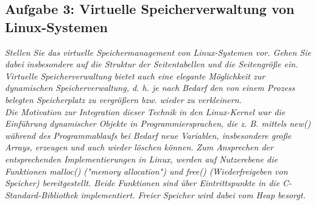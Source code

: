 \documentclass[a4paper]{article}
\begin{document}
\subsection{Aufgabe 3: Virtuelle Speicherverwaltung von Linux-Systemen}
\textit{Stellen Sie das virtuelle Speichermanagement von Linux-Systemen vor. Gehen Sie dabei insbesondere auf die Struktur der Seitentabellen und die Seitengröße ein.\\
    Virtuelle Speicherverwaltung bietet auch eine elegante Möglichkeit zur dynamischen Speicherverwaltung, d. h. je nach Bedarf den von einem Prozess belegten Speicherplatz zu vergrößern bzw. wieder zu verkleinern.\\
    Die Motivation zur Integration dieser Technik in den Linux-Kernel war die Einführung dynamischer Objekte in Programmiersprachen, die z. B. mittels new() während des Programmablaufs bei Bedarf neue Variablen, insbesondere große Arrays, erzeugen und auch wieder löschen können. Zum Ansprechen der entsprechenden Implementierungen in Linux, werden auf Nutzerebene die Funktionen malloc() ("memory allocation") und free() (Wiederfreigeben von Speicher) bereitgestellt. Beide Funktionen sind über Eintrittspunkte in die C-Standard-Bibliothek implementiert. Freier Speicher wird dabei vom Heap besorgt.}
\vspace{10mm}
\end{document}

